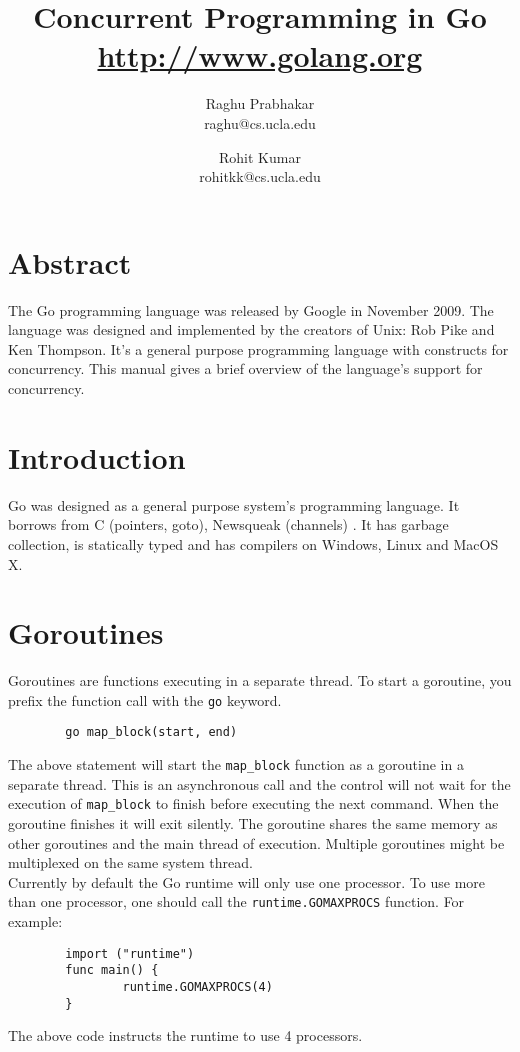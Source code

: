 \documentclass[8pt, twocolumn]{article}
\title{Concurrent Programming in Go \\
\small{\url{http://www.golang.org}}
}
\author{
  Raghu Prabhakar
  \\\small{raghu@cs.ucla.edu}
  \and 
  Rohit Kumar 
  \\\small{rohitkk@cs.ucla.edu}
}
\begin{document}
\maketitle
\section{Abstract}
The Go programming language was released by Google in November
2009. The language was designed and implemented by the creators of
Unix: Rob Pike and Ken Thompson. It's a general purpose programming
language with constructs for concurrency. This manual gives a brief
overview of the language's support for concurrency.\\
\section{Introduction}
Go was designed as a general purpose system's programming language. It
borrows from C (pointers, goto), Newsqueak (channels) \cite{gofaq}. It has garbage
collection, is statically typed and has compilers on Windows, Linux
and MacOS X. 
\section{Goroutines}
Goroutines are functions executing in a separate thread. To start a
goroutine, you prefix the function call with the \verb=go= keyword.
\begin{verbatim}
        go map_block(start, end)
\end{verbatim}
The above statement will start the \verb=map_block= function as a
goroutine in a separate thread. This is an asynchronous call and the
control will not wait for the execution of \verb=map_block= to finish
before executing the next command. When the goroutine finishes it will
exit silently. The goroutine shares the same memory
as other goroutines and the main thread of execution. Multiple
goroutines might be multiplexed on the same system thread.\\

Currently by default the Go runtime will only use one processor. To
use more than one processor, one should call the
\verb=runtime.GOMAXPROCS= function. For example:
\begin{verbatim}
        import ("runtime")        
        func main() {
                runtime.GOMAXPROCS(4)
        }
\end{verbatim}
The above code instructs the runtime to use 4 processors.
\end{document}
